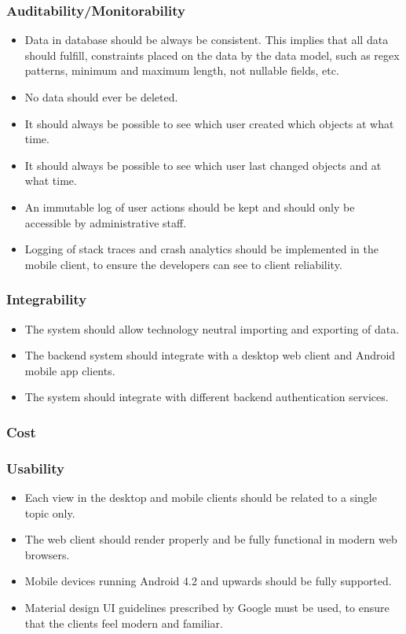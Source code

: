 \documentclass[a4paper,10pt]{article}
\begin{document}
\subsubsection{Auditability/Monitorability}
\begin{itemize}
\item Data in database should be always be consistent. This implies that all data should fulfill, constraints placed on the data by the data model, such as regex patterns, minimum and maximum length, not nullable fields, etc.
\item No data should ever be deleted.
\item It should always be possible to see which user created which objects at what time.
\item It should always be possible to see which user last changed objects and at what time.
\item An immutable log of user actions should be kept and should only be accessible by administrative staff.
\item Logging of stack traces and crash analytics should be implemented in the mobile client, to ensure the developers can see to client reliability.
\end{itemize}

\subsubsection{Integrability}
\begin{itemize}
\item The system should allow technology neutral importing and exporting of data.
\item The backend system should integrate with a desktop web client and Android mobile app clients.
\item The system should integrate with different backend authentication services.
\end{itemize}

\subsubsection{Cost}

\subsubsection{Usability}
\begin{itemize}
\item Each view in the desktop and mobile clients should be related to a single topic only.
\item The web client should render properly and be fully functional in modern web browsers.
\item Mobile devices running Android 4.2 and upwards should be fully supported.
\item Material design UI guidelines prescribed by Google must be used, to ensure that the clients feel modern and familiar. 
\end{itemize}
\end{document}
